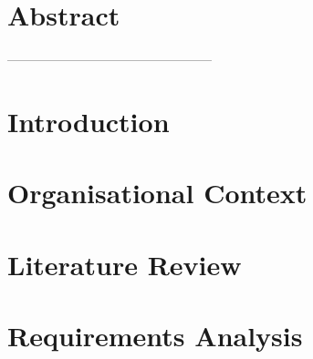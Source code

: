\documentclass[a4paper]{article}
\begin{document}
\section*{Abstract}

\pagebreak
\tableofcontents
\pagebreak------------------------------------------------
\section{Introduction}

\section{Organisational Context}

\section {Literature Review}



\section {Requirements Analysis}
\end{document}
